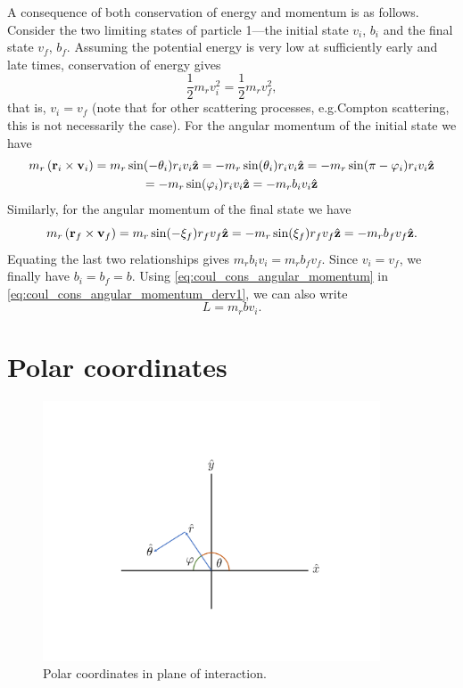 \documentclass[a4paper,11pt]{report}
\begin{document}
A consequence of both conservation of energy and momentum is as follows. Consider the two limiting states of particle 1---the initial state $v_i$, $b_i$ and the final state $v_f$, $b_f$. Assuming the potential energy is very low at sufficiently early and late times, conservation of energy gives
\begin{equation}
    \frac{1}{2} m_r v_i^2 = \frac{1}{2} m_r v_f^2,
\end{equation}
that is, $v_i=v_f$ (note that for other scattering processes, e.g.\@ Compton scattering, this is not necessarily the case). For the angular momentum of the initial state we have
\begin{multline}
    \label{eq:coul_cons_angular_momentum_derv1}
    m_r \left ( \mathbf{r}_i \times \mathbf{v}_i \right ) = m_r \sin(-\theta_i) r_i v_i \hat{\mathbf{z}} = - m_r \sin(\theta_i) r_i v_i \hat{\mathbf{z}} = - m_r \sin(\pi - \varphi_i) r_i v_i \hat{\mathbf{z}} \\
    = - m_r \sin(\varphi_i) r_i v_i \hat{\mathbf{z}} = -m_r b_i v_i \hat{\mathbf{z}}
\end{multline}
Similarly, for the angular momentum of the final state we have
\begin{equation}
    m_r \left ( \mathbf{r}_f \times \mathbf{v}_f \right ) = m_r \sin(-\xi_f) r_f v_f  \hat{\mathbf{z}} = - m_r \sin(\xi_f) r_f v_f \hat{\mathbf{z}} = - m_r b_f v_f \hat{\mathbf{z}}.
\end{equation}
Equating the last two relationships gives $m_r b_i v_i = m_r b_f v_f$. Since $v_i = v_f$, we finally have $b_i = b_f = b$. Using \cref{eq:coul_cons_angular_momentum} in \cref{eq:coul_cons_angular_momentum_derv1}, we can also write
\begin{equation}
    \label{eq:coul_cons_angular_momentum_mag}
    L = m_r b v_i.
\end{equation}

\section{Polar coordinates}
\begin{figure}[ht]
    \centering
    \includegraphics[width=10cm]{../../images/polar_coordinates.pdf}
    \caption{Polar coordinates in plane of interaction.}
    \label{fig:polar_coordinates}
\end{figure}
\end{document}
